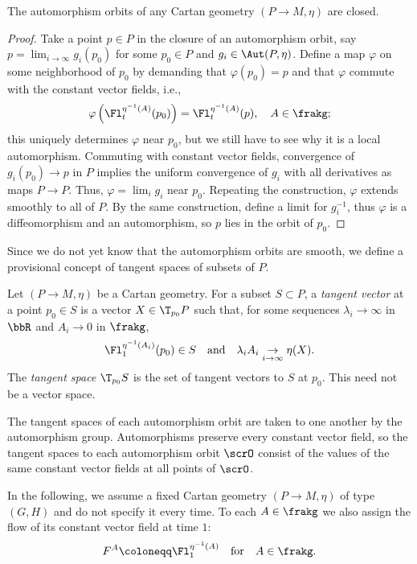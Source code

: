 \begin{thm}
    The automorphism orbits of any Cartan geometry $(P\to M,\eta)$ are closed.
\end{thm}
\begin{proof}
    Take a point $p\in P$ in the closure of an automorphism orbit, say $p=\lim_{i\to\infty} g_i(p_0)$ for some $p_0\in P$ and $g_i\in \Aut(P,\eta)$. Define a map $\varphi$ on some neighborhood of $p_0$ by demanding that $\varphi(p_0)=p$ and that $\varphi$ commute with the constant vector fields, i.e., 
    \[\varphi\left(\Fl_t^{\eta^{-1}(A)}(p_0)\right)=\Fl_t^{\eta^{-1}(A)}(p),\quad A\in\frakg;\]
    this uniquely determines $\varphi$ near $p_0$, but we still have to see why it is a local automorphism. Commuting with constant vector fields, convergence of $g_i(p_0)\to p$ in $P$ implies the uniform convergence of $g_i$ with all derivatives as maps $P\to P$. Thus, $\varphi=\lim_i g_i$ near $p_0$. Repeating the construction, $\varphi$ extends smoothly to all of $P$. By the same construction, define a limit for $g_i^{-1}$, thus $\varphi$ is a diffeomorphism and an automorphism, so $p$ lies in the orbit of $p_0$.
\end{proof}


Since we do not yet know that the automorphism orbits are smooth, we define a provisional concept of tangent spaces of subsets of $P$.

\begin{defn}
    Let $(P\to M,\eta)$ be a Cartan geometry. For a subset $S\subset P$, a \emph{tangent vector} at a point $p_0\in S$ is a vector $X\in \T_{p_0}P$ such that, for some sequences $\lambda_i\to\infty$ in $\bbR$ and $A_i\to 0$ in $\frakg$, 
    \[\Fl^{\eta^{-1}(A_i)}_1(p_0)\in S \quad\text{and}\quad \lambda_iA_i\underset{i\to\infty}{\to} \eta(X).\]
    The \emph{tangent space} $\T_{p_0}S$ is the set of tangent vectors to $S$ at $p_0$. This need not be a vector space.
\end{defn}

The tangent spaces of each automorphism orbit are taken to one another by the automorphism group. Automorphisms preserve every constant vector field, so the tangent spaces to each automorphism orbit $\scrO$ consist of the values of the same constant vector fields at all points of $\scrO$. 

In the following, we assume a fixed Cartan geometry $(P\to M,\eta)$ of type $(G,H)$ and do not specify it every time. To each $A\in\frakg$ we also assign the flow of its constant vector field at time $1$:
\[F^A\coloneqq \Fl^{\eta^{-1}(A)}_1\quad\text{for}\quad  A\in\frakg.\]

